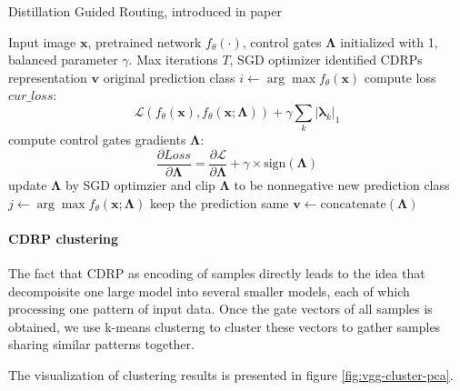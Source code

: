 \documentclass[sigplan,10pt,review]{acmart}\settopmatter{printfolios=true,printccs=false,printacmref=false}
\begin{document}
\begin{algorithm}
	\caption{Distillation Guided Routing, introduced in paper \cite{wang2018interpret}}
	\label{alg:dgr}
	\begin{algorithmic}[1]
		\Require Input image $\boldsymbol{x}$, pretrained network $f_\theta(\cdot)$, control gates $\boldsymbol{\Lambda}$ initialized with 1, balanced parameter $\gamma$. Max iterations $T$, SGD optimizer
		\Ensure identified CDRPs representation $\boldsymbol{v}$
		\State original prediction class $i \gets \arg\max f_\theta(\boldsymbol{x})$
			\State compute loss $cur\_loss$: $$\mathcal{L}\left(f_\theta(\boldsymbol{x}), f_\theta(\boldsymbol{x}; \boldsymbol{\Lambda})\right) + \gamma \sum_k |\boldsymbol{\lambda}_k|_1$$
			\State compute control gates gradients $\boldsymbol{\Lambda}$: $$\frac{\partial Loss}{\partial \boldsymbol{\Lambda}} = \frac{\partial \mathcal{L}}{\partial \boldsymbol{\Lambda}} + \gamma \times \mathrm{sign}(\boldsymbol{\Lambda})$$
			\State update $\boldsymbol{\Lambda}$ by SGD optimzier and clip $\boldsymbol{\Lambda}$ to be nonnegative
			\State new prediction class $j \gets \arg\max f_\theta(\boldsymbol{x};\boldsymbol{\Lambda})$
			 \Comment keep the prediction same
					\State $\boldsymbol{v} \gets \mathrm{concatenate}(\boldsymbol{\Lambda})$
				\EndIf
			\EndIf
		\EndFor		
	\end{algorithmic}
\end{algorithm}

\paragraph{CDRP clustering}

The fact that CDRP as encoding of samples directly leads to the idea that decompoisite one large model into several smaller models, each of which processing one pattern of input data. Once the gate vectors of all samples is obtained, we use k-means clusterng to cluster these vectors to gather samples sharing similar patterns together.

The visualization of clustering results is presented in figure \ref{fig:vgg-cluster-pca}.
\end{document}
